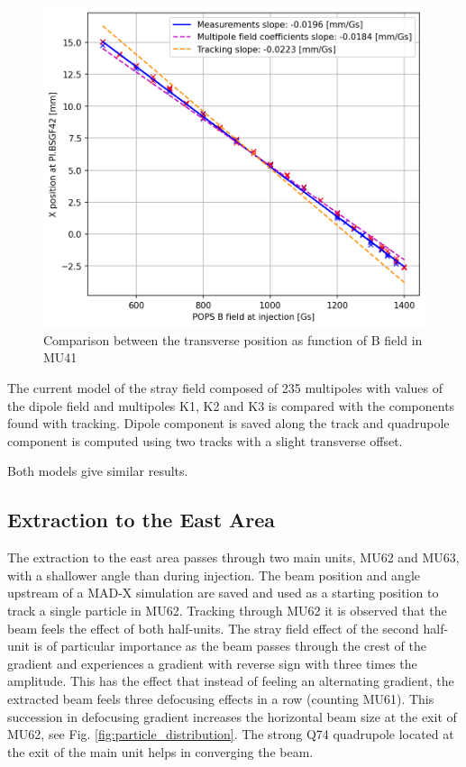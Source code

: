 \documentclass[a4paper,
               biblatex,     %
               keeplastbox,   %
               ]{jacow}
\begin{document}
\begin{figure}[!htb]
   \centering
   \includegraphics*[width=1.0\columnwidth]{transverse_position_vs_POPS}
   \caption{Comparison between the transverse position as function of B field in MU41}
   \label{fig:injection_btp_transverse_position}
\end{figure}

The current model of the stray field composed of 235 multipoles with values of the dipole field and multipoles K1, K2 and K3 is compared with the components found with tracking. Dipole component is saved along the track and quadrupole component is computed using two tracks with a slight transverse offset.



Both models give similar results.


\subsection{Extraction to the East Area}
The extraction to the east area passes through two main units, MU62 and MU63, with a shallower angle than during injection. The beam position and angle upstream of a MAD-X simulation are saved and used as a starting position to track a single particle in MU62. Tracking through MU62 it is observed that the beam feels the effect of both half-units. The stray field effect of the second half-unit is of particular importance as the beam passes through the crest of the gradient and experiences a gradient with reverse sign with three times the amplitude. This has the effect that instead of feeling an alternating gradient, the extracted beam feels three defocusing effects in a row (counting MU61). This succession in defocusing gradient increases the horizontal beam size at the exit of MU62, see Fig. \ref{fig:particle_distribution}. The strong Q74 quadrupole located at the exit of the main unit helps in converging the beam.
\end{document}

